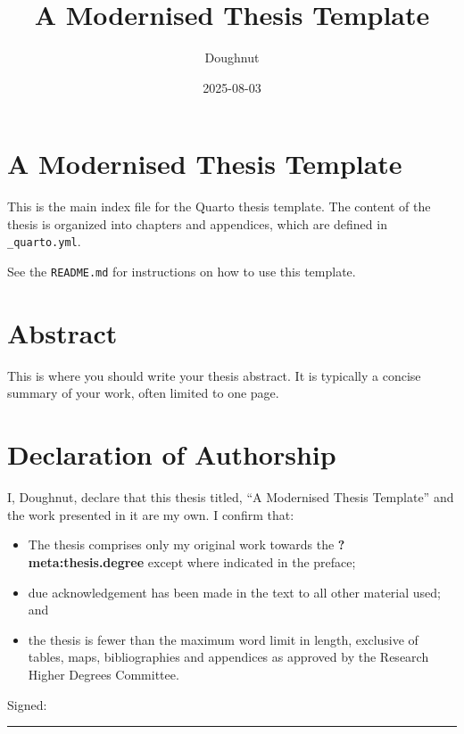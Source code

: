 \documentclass{article}
\title{A Modernised Thesis Template}
\author{Doughnut}
\date{2025-08-03}
\begin{document}
\maketitle


\chapter{A Modernised Thesis
Template}\label{a-modernised-thesis-template}

This is the main index file for the Quarto thesis template. The content
of the thesis is organized into chapters and appendices, which are
defined in \texttt{\_quarto.yml}.

See the \texttt{README.md} for instructions on how to use this template.


\chapter{Abstract}\label{abstract}

This is where you should write your thesis abstract. It is typically a
concise summary of your work, often limited to one page.


\chapter{Declaration of Authorship}\label{declaration-of-authorship}

I, Doughnut, declare that this thesis titled, ``A Modernised Thesis
Template'' and the work presented in it are my own. I confirm that:

\begin{itemize}
\item
  The thesis comprises only my original work towards the
  \textbf{?meta:thesis.degree} except where indicated in the preface;
\item
  due acknowledgement has been made in the text to all other material
  used; and
\item
  the thesis is fewer than the maximum word limit in length, exclusive
  of tables, maps, bibliographies and appendices as approved by the
  Research Higher Degrees Committee.
\end{itemize}

Signed:

\begin{center}\rule{0.5\linewidth}{0.5pt}\end{center}
\end{document}
